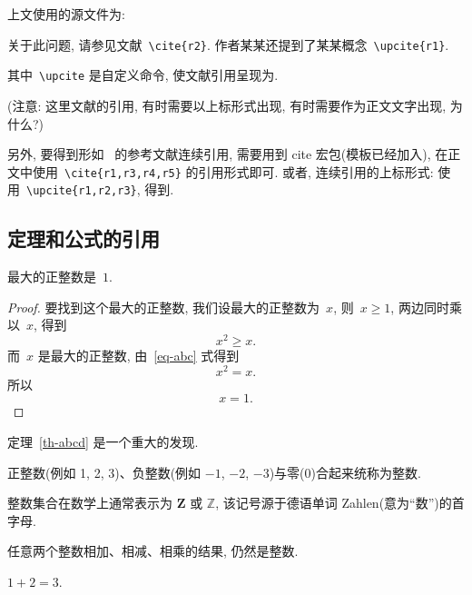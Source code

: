 \documentclass[forprint]{CSUBachelor}
\begin{document}
上文使用的源文件为:

 {\kaishu
关于此问题, 请参见文献~\verb|\cite{r2}|. 作者某某还提到了某某概念~\verb|\upcite{r1}|.
}

其中~\verb|\upcite| 是自定义命令, 使文献引用呈现为.

({\heiti 注意:} {\kaishu 这里文献的引用, 有时需要以上标形式出现, 有时需要作为正文文字出现, 为什么?})

另外, 要得到形如~\cite{r1,r3,r4,r5} 的参考文献连续引用, 需要用到 cite 宏包(模板已经加入),
在正文中使用~\verb|\cite{r1,r3,r4,r5}| 的引用形式即可.
或者, 连续引用的上标形式: 使用~\verb|\upcite{r1,r2,r3}|, 得到.

\subsection{定理和公式的引用}

\begin{theorem}[谁发现的]\label{th-abcd}
最大的正整数是~$1$.
\end{theorem}

\begin{proof}
要找到这个最大的正整数, 我们设最大的正整数为~$x$, 则~$x \geqslant 1$, 两边同时乘以~$x$, 得到
\begin{equation}\label{eq-abc}
x^2 \geqslant x.
\end{equation}
而~$x$ 是最大的正整数, 由~\eqref{eq-abc} 式得到
\[
x^2 = x.
\]
所以
\begin{equation*}
x = 1.
\end{equation*}
\end{proof}

定理~\ref{th-abcd} 是一个重大的发现.
\begin{definition}[整数]
 正整数(例如 1, 2, 3)、负整数(例如 ${−1}$, $−2$, $−3$)与零(0)合起来统称为{\heiti 整数}.
\end{definition}

\begin{remark}
  整数集合在数学上通常表示为 $\mathbf{Z}$ 或 $\mathbb{Z}$, 该记号源于德语单词 Zahlen(意为``数'')的首字母.
\end{remark}

\begin{proposition}
任意两个整数相加、相减、相乘的结果, 仍然是整数.
\end{proposition}

\begin{example}
  $1+2=3$.
\end{example}
\end{document}
